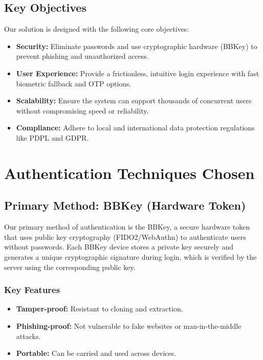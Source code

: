 \documentclass[12pt]{article}
\begin{document}
\subsection*{Key Objectives}
Our solution is designed with the following core objectives:
\begin{itemize}
    \item \textbf{Security:} Eliminate passwords and use cryptographic hardware (BBKey) to prevent phishing and unauthorized access.
    \item \textbf{User Experience:} Provide a frictionless, intuitive login experience with fast biometric fallback and OTP options.
    \item \textbf{Scalability:} Ensure the system can support thousands of concurrent users without compromising speed or reliability.
    \item \textbf{Compliance:} Adhere to local and international data protection regulations like PDPL and GDPR.
\end{itemize}

\section*{Authentication Techniques Chosen}

\subsection*{Primary Method: BBKey (Hardware Token)}
Our primary method of authentication is the BBKey, a secure hardware token that uses public key cryptography (FIDO2/WebAuthn) to authenticate users without passwords. Each BBKey device stores a private key securely and generates a unique cryptographic signature during login, which is verified by the server using the corresponding public key.

\subsubsection*{Key Features}
\begin{itemize}
    \item \textbf{Tamper-proof:} Resistant to cloning and extraction.
    \item \textbf{Phishing-proof:} Not vulnerable to fake websites or man-in-the-middle attacks.
    \item \textbf{Portable:} Can be carried and used across devices.
\end{itemize}
\end{document}
